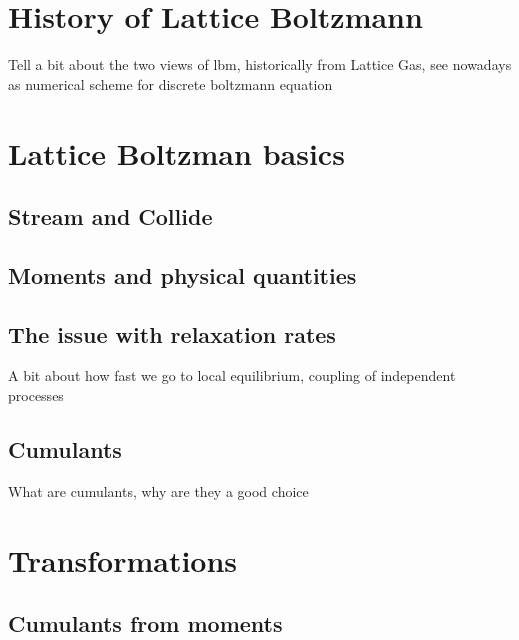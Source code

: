 \documentclass[12pt,a4paper,twoside]{article}
\begin{document}
\newpage
\tableofcontents
\newpage

\pagestyle{headings}

\section{History of Lattice Boltzmann}
\label{sec:History of Lattice Boltzmann}
Tell a bit about the two views of lbm, historically from Lattice Gas, see nowadays as numerical scheme for discrete boltzmann equation

\section{Lattice Boltzman basics}
\label{sec:Lattice Boltzman basics}

\subsection{Stream and Collide}
\label{sub:Stream and Collide}

\subsection{Moments and physical quantities}
\label{sub:Moments and physical quantities}

\subsection{The issue with relaxation rates}
\label{sub:The issue with relaxation rates}
A bit about how fast we go to local equilibrium, coupling of independent processes

\subsection{Cumulants}
\label{sub:Cumulants}
What are cumulants, why are they a good choice

\section{Transformations}
\label{sec:Transformations}

\subsection{Cumulants from moments}
\label{sub:Cumulants from moments}
\end{document}
